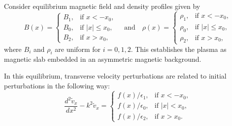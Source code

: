 \documentclass{aastex61}
\begin{document}
Consider equilibrium magnetic field and density profiles given by
\begin{equation}
B(x)=
\begin{cases}
B_1, & \text{if  }x<-x_0, \\
B_0, & \text{if }|x|\leq{x_0}, \\
B_2, & \text{if  }x>x_0,
\end{cases}
\quad \text{and} \quad
\rho(x)=
\begin{cases}
\rho_1, & \text{if  }x<-x_0, \\
\rho_0, & \text{if }|x|\leq{x_0}, \\
\rho_2, & \text{if  }x>x_0,
\end{cases}
\end{equation}
where $B_i$ and $\rho_i$ are uniform for $i = 0,1,2$. This establishes the plasma as magnetic slab embedded in an asymmetric magnetic background.

In this equilibrium, transverse velocity perturbations are related to initial perturbations in the following way:
\begin{equation}
\frac{d^2\tilde{v}_x}{dx^2} - k^2\tilde{v}_x = 
\begin{cases}
f(x)/\epsilon_1, & \text{if  } x<-x_0,\\
f(x)/\epsilon_0, & \text{if  } |x|<x_0,\\
f(x)/\epsilon_2, & \text{if  } x>x_0.
\end{cases}
\label{ivp gov slab}
\end{equation}
\end{document}
